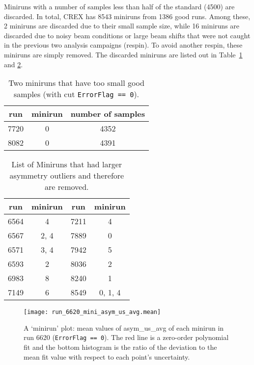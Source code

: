 Miniruns with a number of samples less than half of the standard (4500) are discarded.
In total, CREX has 8543 miniruns from 1386 good runs. Among these, 2 miniruns are discarded
due to their small sample size, while 16 miniruns are discarded due to noisy beam conditions 
or large beam shifts that were not caught in the previous two analysis campaigns (respin). 
To avoid another respin, these miniruns are simply removed. %
The discarded miniruns are listed out in Table~\ref{tab:short_miniruns} and \ref{tab:bad_miniruns}.
\begin{table}[!h]
    \centering
    \begin{tabular}{c c c}
	\hline
	run & minirun	& number of samples \\
	\hline
	7720	& 0 & 4352  \\
	8082	& 0 & 4391  \\
	\hline
    \end{tabular}
    \caption{Two miniruns that have too small good samples (with cut \texttt{ErrorFlag == 0}).}
    \label{tab:short_miniruns}
\end{table}
\begin{table}[!h]
    \centering
    \begin{tabular}{c c | c c}
	\hline
	run & minirun	& run	& minirun   \\
	\hline
	6564	& 4	& 7211	& 4 \\
	6567	& 2, 4	& 7889	& 0 \\
	6571	& 3, 4	& 7942	& 5 \\
	6593	& 2	& 8036	& 2 \\
	6983	& 8	& 8240	& 1 \\
	7149	& 6	& 8549	& 0, 1, 4   \\
	\hline
    \end{tabular}
    \caption{List of Miniruns that had larger asymmetry outliers and therefore
    are removed.}
    \label{tab:bad_miniruns}
\end{table}
\begin{figure}[!h]
    \centering
    \texttt{[image: run\_6620\_mini\_asym\_us\_avg.mean]}
    \caption[A minirun plot]
    {A `minirun' plot: mean values of asym\_us\_avg of each minirun in 
    run 6620 (\texttt{ErrorFlag == 0}).
    The red line is a zero-order polynomial fit and the bottom histogram is
    the ratio of the deviation to the mean fit value with respect to each point's uncertainty.
    }
\end{figure}

